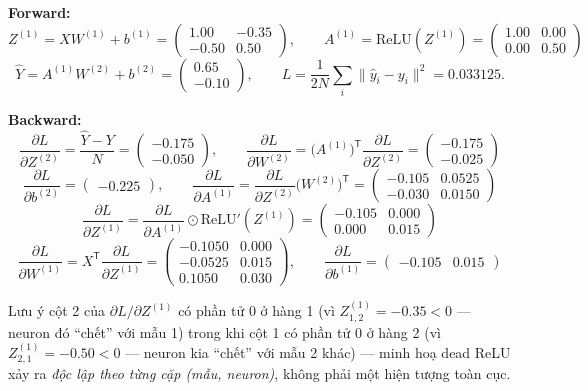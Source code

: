 \documentclass[12pt,a4paper]{report}
\newcommand{\T}{^{\mathsf{T}}}
\begin{document}
\textbf{Forward:}
$$Z^{(1)}=XW^{(1)}+b^{(1)} = \begin{pmatrix}1.00 & -0.35\\ -0.50 & 0.50\end{pmatrix},\qquad
A^{(1)}=\mathrm{ReLU}(Z^{(1)}) = \begin{pmatrix}1.00 & 0.00\\ 0.00 & 0.50\end{pmatrix}$$
$$\hat Y = A^{(1)}W^{(2)}+b^{(2)} = \begin{pmatrix}0.65\\ -0.10\end{pmatrix},\qquad
L=\frac{1}{2N}\sum_i\lVert \hat y_i-y_i\rVert^2 = 0.033125.$$

\textbf{Backward:}
$$\frac{\partial L}{\partial Z^{(2)}} = \frac{\hat Y-Y}{N} = \begin{pmatrix}-0.175\\ -0.050\end{pmatrix},\qquad
\frac{\partial L}{\partial W^{(2)}} = \big(A^{(1)}\big)\T\frac{\partial L}{\partial Z^{(2)}} = \begin{pmatrix}-0.175\\ -0.025\end{pmatrix}$$
$$\frac{\partial L}{\partial b^{(2)}} = \begin{pmatrix}-0.225\end{pmatrix},\qquad
\frac{\partial L}{\partial A^{(1)}} = \frac{\partial L}{\partial Z^{(2)}}\big(W^{(2)}\big)\T = \begin{pmatrix}-0.105 & 0.0525\\ -0.030 & 0.0150\end{pmatrix}$$
$$\frac{\partial L}{\partial Z^{(1)}} = \frac{\partial L}{\partial A^{(1)}}\odot\mathrm{ReLU}'(Z^{(1)}) = \begin{pmatrix}-0.105 & 0.000\\ 0.000 & 0.015\end{pmatrix}$$
$$\frac{\partial L}{\partial W^{(1)}} = X\T\frac{\partial L}{\partial Z^{(1)}} = \begin{pmatrix}-0.1050 & 0.000\\ -0.0525 & 0.015\\ 0.1050 & 0.030\end{pmatrix},\qquad
\frac{\partial L}{\partial b^{(1)}} = \begin{pmatrix}-0.105 & 0.015\end{pmatrix}$$

Lưu ý cột 2 của $\partial L/\partial Z^{(1)}$ có phần tử $0$ ở hàng 1 (vì
$Z^{(1)}_{1,2}=-0.35<0$ --- neuron đó ``chết'' với mẫu 1) trong khi cột 1
có phần tử $0$ ở hàng 2 (vì $Z^{(1)}_{2,1}=-0.50<0$ --- neuron kia
``chết'' với mẫu 2 khác) --- minh hoạ dead ReLU xảy ra \emph{độc lập theo
từng cặp (mẫu, neuron)}, không phải một hiện tượng toàn cục.
\end{document}
